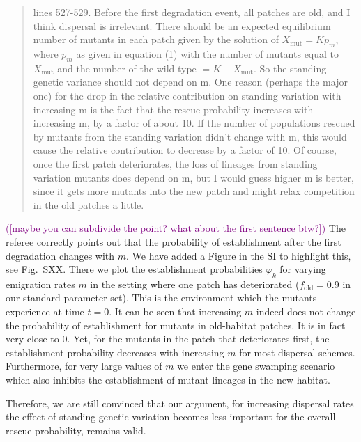 \documentclass[11pt]{article}
\newenvironment{referee}{\vspace{0.cm} \sffamily \color{colreferee} \begin{quotation} }{\end{quotation} \vspace{0.cm}}
\newcommand{\lmarginpar}[1]{\reversemarginpar\marginpar{\textcolor{colreferee}{\textbf{\textsf{[#1]}}}}}
\newcommand{\addnb}[1]{\refstepcounter{numcom}\lmarginpar{\arabic{numcom}}\label{#1}}
\newcommand{\florence}[1]{\textcolor{purple}{(#1)}}
\newcounter{numcom}
\begin{document}
\begin{referee}
lines 527-529.\addnb{R2_45} Before the first degradation event, all patches are old, and I think dispersal is irrelevant. There should be an expected equilibrium number of mutants in each patch given by the solution of $X_{\text{mut}} = K p_m$, where $p_m$ as given in equation (1) with the number of mutants equal to $X_{\text{mut}}$ and the number of the wild type $= K - X_{\text{mut}}$. So the standing genetic variance should not depend on m. One reason (perhaps the major one) for the drop in the relative contribution on standing variation with increasing m is the fact that the rescue probability increases with increasing m, by a factor of about 10. If the number of populations rescued by mutants from the standing variation didn't change with m, this would cause the relative contribution to decrease by a factor of 10. Of course, once the first patch deteriorates, the loss of lineages from standing variation mutants does depend on m, but I would guess higher m is better, since it gets more mutants into the new patch and might relax competition in the old patches a little.
\end{referee}

\florence{[maybe you can subdivide the point? what about the first sentence btw?]}
The referee correctly points out that the probability of establishment after the first degradation changes with $m$. We have added a Figure in the SI to highlight this, see Fig.~SXX. There we plot the establishment probabilities $\varphi_{k}$ for varying emigration rates $m$ in the setting where one patch has deteriorated ($f_{\text{old}}=0.9$ in our standard parameter set). This is the environment which the mutants experience at time $t=0$. It can be seen that increasing $m$ indeed does not change the probability of establishment for mutants in old-habitat patches. It is in fact very close to $0$. Yet, for the mutants in the patch that deteriorates first, the establishment probability decreases with increasing $m$ for most dispersal schemes. Furthermore, for very large values of $m$ we enter the gene swamping scenario which also inhibits the establishment of mutant lineages in the new habitat. 

Therefore, we are still convinced that our argument, for increasing dispersal rates the effect of standing genetic variation becomes less important for the overall rescue probability, remains valid. %
\end{document}
